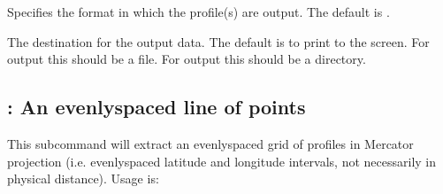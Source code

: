 \documentclass[letterpaper,10pt,english]{sphinxmanual}
\begin{document}
\sphinxAtStartPar
{}
\begin{description}
\sphinxAtStartPar
Specifies the format in which the profile(s) are output.  The default is .

\sphinxAtStartPar
The destination for the output data.  The default is to print to the screen.  For  output this should be a file.  For  output this should be a directory.

\sphinxAtStartPar
{}

\sphinxAtStartPar
{}

\end{description}


\subsection{: An evenly\sphinxhyphen{}spaced line of points}
\label{\detokenize{userguide:grid-an-evenly-spaced-line-of-points}}
\sphinxAtStartPar
This subcommand will extract an evenly\sphinxhyphen{}spaced grid of profiles in Mercator projection (i.e. evenly\sphinxhyphen{}spaced latitude and longitude intervals, not necessarily in physical distance).  Usage is:

\sphinxAtStartPar
{}
\end{document}
